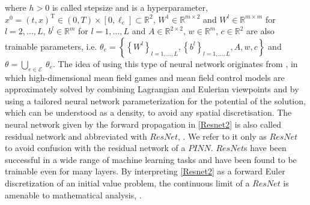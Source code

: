 where $h > 0$ is called stepsize and is a hyperparameter, $x^0 = (t, x)^{\mathrm{T}} \in (0, T) \times [0, \ell_e] \subset \mathbb{R}^2$, $W^1 \in \mathbb{R}^{m \times 2}$ and $W^l \in \mathbb{R}^{m \times m}$ for $l = 2, \ldots, L$, $b^l \in \mathbb{R}^{m}$ for $l = 1, \ldots, L$ and $A \in \mathbb{R}^{2 \times 2}$, $w \in \mathbb{R}^m$, $c \in \mathbb{R}^2$ are also trainable parameters, i.e. $\theta_e = \left\{ \left\{ W^l \right\}_{l = 1, \ldots, L}, \left\{ b^l \right\}_{l = 1, \ldots, L}, A, w, c \right\}$ and $\theta = \bigcup_{e \in \mathcal{E}} \ \theta_e$. The idea of using this type of neural network originates from \cite{RuthottoOsherLiNurbekyanFung2020}, in which high-dimensional mean field games and mean field control models are approximately solved by combining Lagrangian and Eulerian viewpoints and by using a tailored neural network parameterization for the potential of the solution, which can be understood as a density, to avoid any spatial discretisation. The neural network given by the forward propagation in \cref{Resnet2} is also called residual network and abbreviated with $ResNet$, \cite{HeZhangRenSun:2015}. We refer to it only as $ResNet$ to avoid confusion with the residual network of a $PINN$. $ResNet$s have been successful in a wide range of machine learning tasks and have been found to be trainable even for many layers. By interpreting \cref{Resnet2} as a forward Euler discretization of an initial value problem, the continuous limit of a $ResNet$ is amenable to mathematical analysis, \cite[p.~6]{RuthottoOsherLiNurbekyanFung2020}. \\

